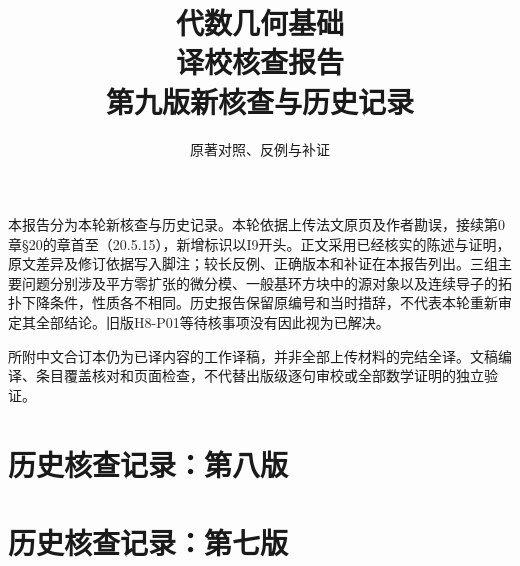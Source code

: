 
\newcommand{\RR}{\mathcal R}
\newcommand{\FF}{\mathcal F}
\newcommand{\GG}{\mathcal G}
\newcommand{\MM}{\mathcal M}
\newcommand{\JJ}{\mathcal J}
\newcommand{\oldauditsrc}[1]{\par\noindent\textbf{原文位置：}#1。\par}
\newcommand{\kind}[2]{\noindent\textbf{分类：#1。}\ #2\par}
\newcommand{\lead}[1]{\par\noindent\textbf{#1}\quad}
\newenvironment{analysisproof}{\par\noindent\textbf{该轮核查的反例或补证。}\ }{\par}

\title{代数几何基础\\译校核查报告\\[1em]\large 第九版新核查与历史记录}
\author{原著对照、反例与补证}
\date{}

\frontmatter
\maketitle
{}
本报告分为本轮新核查与历史记录。本轮依据上传法文原页及作者勘误，接续第0章§20的章首至（20.5.15），新增标识以I9开头。正文采用已经核实的陈述与证明，原文差异及修订依据写入脚注；较长反例、正确版本和补证在本报告列出。三组主要问题分别涉及平方零扩张的微分模、一般基环方块中的源对象以及连续导子的拓扑下降条件，性质各不相同。历史报告保留原编号和当时措辞，不代表本轮重新审定其全部结论。旧版H8-P01等待核事项没有因此视为已解决。

所附中文合订本仍为已译内容的工作译稿，并非全部上传材料的完结全译。文稿编译、条目覆盖核对和页面检查，不代替出版级逐句审校或全部数学证明的独立验证。
\tableofcontents
\mainmatter

\part*{历史核查记录：第八版}

\part*{历史核查记录：第七版}

